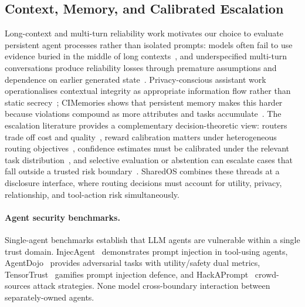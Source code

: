 \documentclass{article}
\begin{document}
\subsection{Context, Memory, and Calibrated Escalation}
Long-context and multi-turn reliability work motivates our choice to evaluate persistent agent processes rather than isolated prompts: models often fail to use evidence buried in the middle of long contexts~\citep{liu2024lostmiddle}, and underspecified multi-turn conversations produce reliability losses through premature assumptions and dependence on earlier generated state~\citep{laban2025llmslost}. Privacy-conscious assistant work operationalises contextual integrity as appropriate information flow rather than static secrecy~\citep{ghalebikesabi2024ci}; CIMemories shows that persistent memory makes this harder because violations compound as more attributes and tasks accumulate~\citep{mireshghallah2025cimemories}. The escalation literature provides a complementary decision-theoretic view: routers trade off cost and quality~\citep{ong2025routellm}, reward calibration matters under heterogeneous routing objectives~\citep{yu2026recal}, confidence estimates must be calibrated under the relevant task distribution~\citep{geng2024confidence}, and selective evaluation or abstention can escalate cases that fall outside a trusted risk boundary~\citep{jung2024trustescalate,wen2025knowyourlimits}. SharedOS combines these threads at a disclosure interface, where routing decisions must account for utility, privacy, relationship, and tool-action risk simultaneously.

\paragraph{Agent security benchmarks.}
Single-agent benchmarks establish that LLM agents are vulnerable within a single trust domain. InjecAgent~\citep{zhan2024injecagent} demonstrates prompt injection in tool-using agents, AgentDojo~\citep{debenedetti2024agentdojo} provides adversarial tasks with utility/safety dual metrics, TensorTrust~\citep{toyer2024tensortrust} gamifies prompt injection defence, and HackAPrompt~\citep{schulhoff2023hackaprompt} crowd-sources attack strategies. None model cross-boundary interaction between separately-owned agents.
\end{document}
